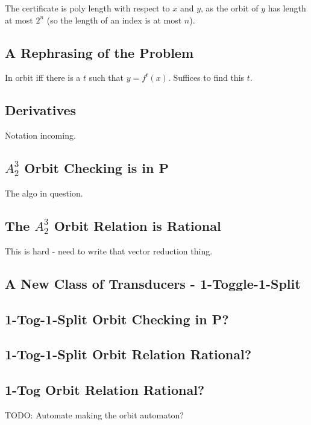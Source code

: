 \documentclass{article}
\begin{document}
The certificate is poly length with respect to $x$ and $y$, as the orbit of $y$ has length at most $2^n$ (so the length of an index is at most $n$).

\subsection*{A Rephrasing of the Problem}
In orbit iff there is a $t$ such that $y = f^t(x)$. Suffices to find this $t$.

\subsection*{Derivatives}
Notation incoming.

\subsection*{$A^3_2$ Orbit Checking is in P}
The algo in question.

\subsection*{The $A^3_2$ Orbit Relation is Rational}
This is hard - need to write that vector reduction thing.

\subsection*{A New Class of Transducers - 1-Toggle-1-Split}

\subsection*{1-Tog-1-Split Orbit Checking in P?}

\subsection*{1-Tog-1-Split Orbit Relation Rational?}

\subsection*{1-Tog Orbit Relation Rational?}

TODO: Automate making the orbit automaton?
\end{document}
